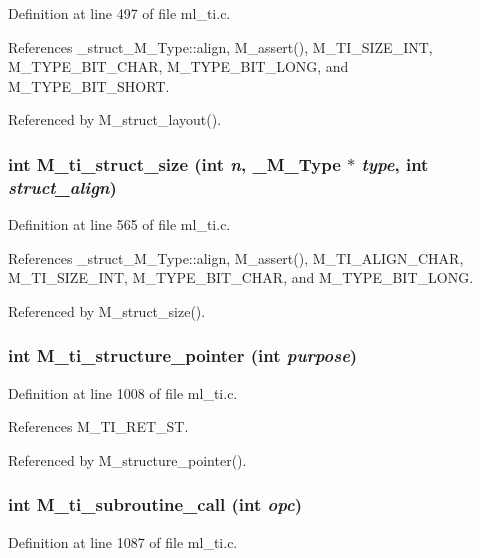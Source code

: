 Definition at line 497 of file ml\_\-ti.c.

References \_\-struct\_\-M\_\-Type::align, M\_\-assert(), M\_\-TI\_\-SIZE\_\-INT, M\_\-TYPE\_\-BIT\_\-CHAR, M\_\-TYPE\_\-BIT\_\-LONG, and M\_\-TYPE\_\-BIT\_\-SHORT.

Referenced by M\_\-struct\_\-layout().
\subsubsection{\setlength{\rightskip}{0pt plus 5cm}int M\_\-ti\_\-struct\_\-size (int {\em n}, \bf{\_\-M\_\-Type} $\ast$ {\em type}, int {\em struct\_\-align})}\label{ml__ti_8c_06ed7bba2d8d5b01dd68e2d020f101b5}




Definition at line 565 of file ml\_\-ti.c.

References \_\-struct\_\-M\_\-Type::align, M\_\-assert(), M\_\-TI\_\-ALIGN\_\-CHAR, M\_\-TI\_\-SIZE\_\-INT, M\_\-TYPE\_\-BIT\_\-CHAR, and M\_\-TYPE\_\-BIT\_\-LONG.

Referenced by M\_\-struct\_\-size().
\subsubsection{\setlength{\rightskip}{0pt plus 5cm}int M\_\-ti\_\-structure\_\-pointer (int {\em purpose})}\label{ml__ti_8c_48bbc2be514120d89b28c04379fb68cb}




Definition at line 1008 of file ml\_\-ti.c.

References M\_\-TI\_\-RET\_\-ST.

Referenced by M\_\-structure\_\-pointer().
\subsubsection{\setlength{\rightskip}{0pt plus 5cm}int M\_\-ti\_\-subroutine\_\-call (int {\em opc})}\label{ml__ti_8c_21818721d762b5b5f51f7d7988e9f59f}




Definition at line 1087 of file ml\_\-ti.c.


